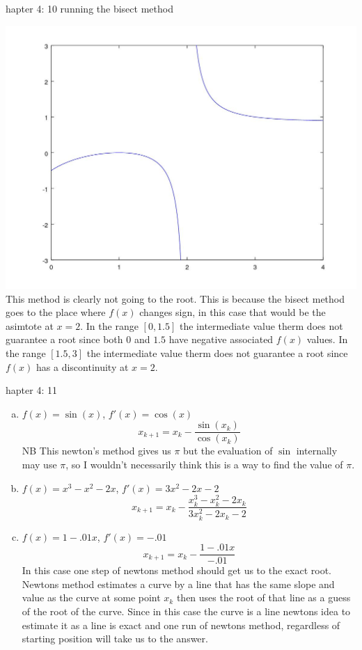 \documentclass[12pt]{article}
\makeatletter
\theoremstyle{homework}
\newenvironment{exercise}[1]
{\def\@currentlabel{#1}\exercisecore}
{\endexercisecore}
\makeatother
\begin{document}
\begin{exercise}

Chapter 4: 10
\end{exercise}
running the bisect method


\includegraphics[scale=.4]{../octave/q20fig.jpg}\\
This method is clearly not going to the root.  This is because the bisect method goes to the place where $f(x)$ changes sign, in this case that would be the asimtote at $x=2$.  In the range $[0,1.5]$ the intermediate value therm does not guarantee a root since both $0$ and $1.5$ have negative associated $f(x)$ values.  In the range $[1.5,3]$ the intermediate value therm does not guarantee a root since $f(x)$ has a discontinuity at $x=2$.

\begin{exercise}

Chapter 4: 11
\end{exercise}
\begin{enumerate}[(a)]
\item
$f(x)=\sin (x)$, $f'(x)=\cos (x)$
$$x_{k+1}=x_k-\frac{\sin (x_k)}{\cos (x_k)}$$
NB  This newton's method gives us $\pi$ but the evaluation of $\sin$ internally may use $\pi$, so I wouldn't necessarily think this is a way to find the value of $\pi$.

\item
$f(x)=x^3-x^2-2x$, $f'(x)=3x^2-2x-2$
$$x_{k+1}=x_k-\frac{x_k^3-x_k^2-2x_k}{3x_k^2-2x_k-2}$$

\item
$f(x)=1-.01x$, $f'(x)=-.01$
$$x_{k+1}=x_k-\frac{1-.01x}{-.01}$$
In this case one step of newtons method should get us to the exact root.  Newtons method estimates a curve by a line that has the same slope and value as the curve at some point $x_k$ then uses the root of that line as a guess of the root of the curve.  Since in this case the curve is a line newtons idea to estimate it as a line is exact and one run of newtons method, regardless of starting position will take us to the answer.
\end{enumerate}

\newpage

\end{document}
